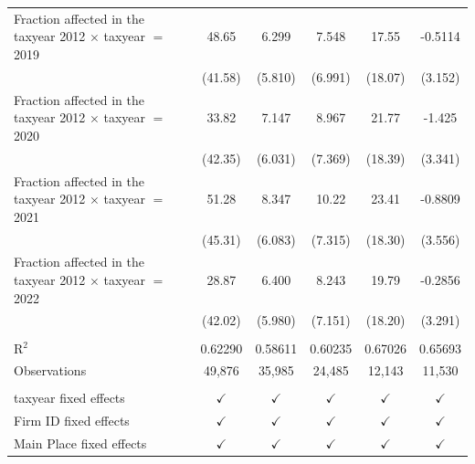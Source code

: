 \begin{tabular}{lccccc}
   Fraction affected in the taxyear 2012 $\times$ taxyear $=$ 2019  & 48.65         & 6.299         & 7.548         & 17.55         & -0.5114\\   
                                                                    & (41.58)       & (5.810)       & (6.991)       & (18.07)       & (3.152)\\   
   Fraction affected in the taxyear 2012 $\times$ taxyear $=$ 2020  & 33.82         & 7.147         & 8.967         & 21.77         & -1.425\\   
                                                                    & (42.35)       & (6.031)       & (7.369)       & (18.39)       & (3.341)\\   
   Fraction affected in the taxyear 2012 $\times$ taxyear $=$ 2021  & 51.28         & 8.347         & 10.22         & 23.41         & -0.8809\\   
                                                                    & (45.31)       & (6.083)       & (7.315)       & (18.30)       & (3.556)\\   
   Fraction affected in the taxyear 2012 $\times$ taxyear $=$ 2022  & 28.87         & 6.400         & 8.243         & 19.79         & -0.2856\\   
                                                                    & (42.02)       & (5.980)       & (7.151)       & (18.20)       & (3.291)\\   
    \\
   R$^2$                                                            & 0.62290       & 0.58611       & 0.60235       & 0.67026       & 0.65693\\  
   Observations                                                     & 49,876        & 35,985        & 24,485        & 12,143        & 11,530\\  
    \\
   taxyear fixed effects                                            & $\checkmark$  & $\checkmark$  & $\checkmark$  & $\checkmark$  & $\checkmark$\\   
   Firm ID fixed effects                                            & $\checkmark$  & $\checkmark$  & $\checkmark$  & $\checkmark$  & $\checkmark$\\   
   Main Place fixed effects                                         & $\checkmark$  & $\checkmark$  & $\checkmark$  & $\checkmark$  & $\checkmark$\\   
   \bottomrule
\end{tabular}
\par\endgroup

